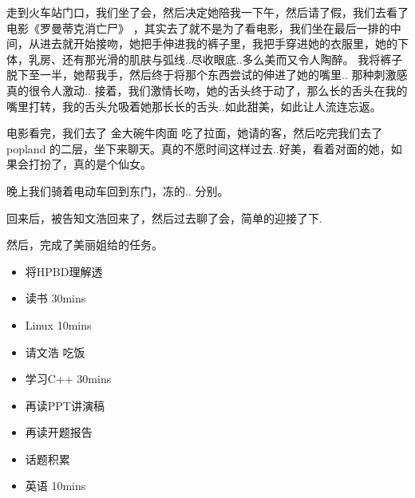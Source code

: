 \documentclass[UTF8,a4paper,8pt]{ctexbook}
\begin{document}
		 	 走到火车站门口，我们坐了会，然后决定她陪我一下午，然后请了假，我们去看了电影《罗曼蒂克消亡尸》 ，其实去了就不是为了看电影，我们坐在最后一排的中间，从进去就开始接吻，她把手伸进我的裤子里，我把手穿进她的衣服里，她的下体，乳房、还有那光滑的肌肤与弧线..尽收眼底..多么美而又令人陶醉。 我将裤子脱下至一半，她帮我手，然后终于将那个东西尝试的伸进了她的嘴里.. 那种刺激感真的很令人激动.. 接着，我们激情长吻，她的舌头终于动了，那么长的舌头在我的嘴里打转，我的舌头允吸着她那长长的舌头..如此甜美，如此让人流连忘返。
		 	 
		 	 电影看完，我们去了 金大碗牛肉面 吃了拉面，她请的客，然后吃完我们去了popland 的二层，坐下来聊天。真的不愿时间这样过去..好美，看着对面的她，如果会打扮了，真的是个仙女。
		 	 
		 	 晚上我们骑着电动车回到东门，冻的.. 分别。
		 	 
		 	 回来后，被告知文浩回来了，然后过去聊了会，简单的迎接了下.
		 	 
		 	 然后，完成了美丽姐给的任务。
		 	 \begin{itemize}
		 	 	\item  \makebox[0pt][l]{$\square$}\raisebox{.15ex}{\hspace{0.1em}$\checkmark$}将HPBD理解透
		 	 	\item  \makebox[0pt][l]{$\square$}\raisebox{.15ex}{\hspace{0.1em}$\checkmark$}读书  30mins	
		 	 	\item  \makebox[0pt][l]{$\square$}\raisebox{.15ex}{\hspace{0.1em}$\checkmark$}Linux 10mins
		 	 	\item  \makebox[0pt][l]{$\square$}\raisebox{.15ex}{\hspace{0.1em}$\checkmark$}请文浩 吃饭	  
		 	 	\item  \makebox[0pt][l]{$\square$}\raisebox{.15ex}{\hspace{0.1em}$\checkmark$}学习C++ 30mins 
		 	 	
		 	 	\item  \makebox[0pt][l]{$\square$}\raisebox{.15ex}{\hspace{0.1em}$\checkmark$}再读PPT讲演稿
		 	 	\item  \makebox[0pt][l]{$\square$}\raisebox{.15ex}{\hspace{0.1em}$\checkmark$}再读开题报告
		 	 	
		 	 	\item  \makebox[0pt][l]{$\square$}\raisebox{.15ex}{\hspace{0.1em}$\checkmark$}话题积累 	
		 	 	\item  英语 10mins 	 
		 	 \end{itemize}
		 	 
\end{document}
